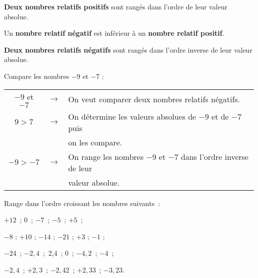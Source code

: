 \newpage

\begin{aconnaitre}
\textbf{Deux nombres relatifs positifs} sont rangés dans l'ordre de leur valeur absolue.

Un \textbf{nombre relatif négatif} est inférieur à un \textbf{nombre relatif positif}.

\textbf{Deux nombres relatifs négatifs} sont rangés dans l'ordre inverse de leur valeur absolue.
\end{aconnaitre}

\vspace{4em}


\begin{methode*1}

\begin{exemple*1}
Compare les nombres $-9$ et $-7$ : \\[0.5em]
\begin{tabular}{ccl} 
 $-9$ et $-7$ & $\longrightarrow$ & On veut comparer deux nombres relatifs négatifs. \\
 $9 > 7$ & $\longrightarrow$ & On détermine les valeurs absolues de $-9$ et de $-7$ puis  \\
& & on les compare. \\
 $-9 > -7$ & $\longrightarrow$ & On range les nombres $-9$ et $-7$ dans l'ordre inverse de leur  \\
 & & valeur absolue. \\
 \end{tabular}
\end{exemple*1}


\exercice
Range dans l'ordre croissant les nombres suivants : 
\begin{colenumerate}{2}
 \item $+12$ ; 0 ; $-7$ ; $-5$ ; $+5$ ;
 \item $-8$ ; $+10$ ; $- 14$ ; $-21$ ; $+3$ ; $-1$ ;
 \item $-24$ ; $-2,4$ ; 2,4 ; 0 ; $- 4,2$ ; $-4$ ;
 \item $-2,4$ ; $+2,3$ ; $-2,42$ ; $+2,33$ ; $-3,23$.
 \end{colenumerate}

\end{methode*1}

